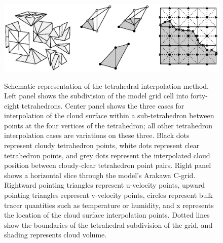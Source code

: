 \documentclass[12pt]{article}
\begin{document}
\begin{figure}[t]
  \noindent
  \includegraphics[width=40pc,angle=0]{./figures/tetrahedral_scheme}\\
  \caption{Schematic representation of the tetrahedral interpolation 
  method.  Left panel shows the subdivision of the model grid cell into 
  forty-eight tetrahedrons.  Center panel shows the three cases for 
  interpolation of the cloud surface within a sub-tetrahedron between points at 
  the four vertices of the tetrahedron; all other tetrahedron interpolation 
  cases are variations on these three.  Black dots represent cloudy tetrahedron 
  points, white dots represent clear tetrahedron points, and grey dots represent
  the interpolated cloud position between cloudy-clear tetrahedron point pairs.  
  Right panel shows a horizontal slice through the model's Arakawa C-grid.  
  Rightward pointing triangles represent u-velocity points, upward pointing 
  triangles represent v-velocity points, circles represent bulk tracer 
  quantities such as temperature or humidity, and x represents the location of 
  the cloud surface interpolation points.  Dotted lines show the boundaries of 
  the tetrahedral subdivision of the grid, and shading represents cloud volume.}
  \label{fig:tetrahedral_scheme}
\end{figure}
\end{document}
